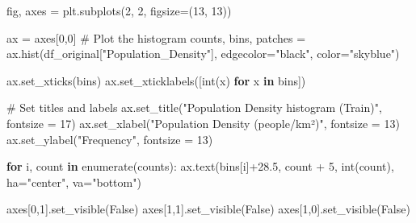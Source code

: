 \documentclass[
  letterpaper,
  DIV=11,
  numbers=noendperiod]{scrartcl}
\newenvironment{Shaded}{\begin{snugshade}}{\end{snugshade}}
\newcommand{\BuiltInTok}[1]{\textcolor[rgb]{0.00,0.23,0.31}{#1}}
\newcommand{\CommentTok}[1]{\textcolor[rgb]{0.37,0.37,0.37}{#1}}
\newcommand{\ControlFlowTok}[1]{\textcolor[rgb]{0.00,0.23,0.31}{\textbf{#1}}}
\newcommand{\DecValTok}[1]{\textcolor[rgb]{0.68,0.00,0.00}{#1}}
\newcommand{\FloatTok}[1]{\textcolor[rgb]{0.68,0.00,0.00}{#1}}
\newcommand{\KeywordTok}[1]{\textcolor[rgb]{0.00,0.23,0.31}{\textbf{#1}}}
\newcommand{\NormalTok}[1]{\textcolor[rgb]{0.00,0.23,0.31}{#1}}
\newcommand{\OperatorTok}[1]{\textcolor[rgb]{0.37,0.37,0.37}{#1}}
\newcommand{\StringTok}[1]{\textcolor[rgb]{0.13,0.47,0.30}{#1}}
\newcommand{\VariableTok}[1]{\textcolor[rgb]{0.07,0.07,0.07}{#1}}
\begin{document}
\begin{Shaded}
\begin{Highlighting}[]
\NormalTok{fig, axes }\OperatorTok{=}\NormalTok{ plt.subplots(}\DecValTok{2}\NormalTok{, }\DecValTok{2}\NormalTok{, figsize}\OperatorTok{=}\NormalTok{(}\DecValTok{13}\NormalTok{, }\DecValTok{13}\NormalTok{))}

\NormalTok{ax }\OperatorTok{=}\NormalTok{ axes[}\DecValTok{0}\NormalTok{,}\DecValTok{0}\NormalTok{]}
\CommentTok{\# Plot the histogram}
\NormalTok{counts, bins, patches }\OperatorTok{=}\NormalTok{ ax.hist(df\_original[}\StringTok{"Population\_Density"}\NormalTok{], edgecolor}\OperatorTok{=}\StringTok{"black"}\NormalTok{, color}\OperatorTok{=}\StringTok{"skyblue"}\NormalTok{)}

\NormalTok{ax.set\_xticks(bins) }
\NormalTok{ax.set\_xticklabels([}\BuiltInTok{int}\NormalTok{(x) }\ControlFlowTok{for}\NormalTok{ x }\KeywordTok{in}\NormalTok{ bins])}

\CommentTok{\# Set titles and labels}
\NormalTok{ax.set\_title(}\StringTok{"Population Density histogram (Train)"}\NormalTok{, fontsize }\OperatorTok{=} \DecValTok{17}\NormalTok{)}
\NormalTok{ax.set\_xlabel(}\StringTok{"Population Density (people/km²)"}\NormalTok{, fontsize }\OperatorTok{=} \DecValTok{13}\NormalTok{)}
\NormalTok{ax.set\_ylabel(}\StringTok{"Frequency"}\NormalTok{, fontsize }\OperatorTok{=} \DecValTok{13}\NormalTok{)}

\ControlFlowTok{for}\NormalTok{ i, count }\KeywordTok{in} \BuiltInTok{enumerate}\NormalTok{(counts):}
\NormalTok{    ax.text(bins[i]}\OperatorTok{+}\FloatTok{28.5}\NormalTok{, count }\OperatorTok{+} \DecValTok{5}\NormalTok{, }\BuiltInTok{int}\NormalTok{(count), ha}\OperatorTok{=}\StringTok{"center"}\NormalTok{, va}\OperatorTok{=}\StringTok{"bottom"}\NormalTok{)}

\NormalTok{axes[}\DecValTok{0}\NormalTok{,}\DecValTok{1}\NormalTok{].set\_visible(}\VariableTok{False}\NormalTok{)}
\NormalTok{axes[}\DecValTok{1}\NormalTok{,}\DecValTok{1}\NormalTok{].set\_visible(}\VariableTok{False}\NormalTok{)}
\NormalTok{axes[}\DecValTok{1}\NormalTok{,}\DecValTok{0}\NormalTok{].set\_visible(}\VariableTok{False}\NormalTok{)}
\end{Highlighting}
\end{Shaded}
\end{document}
